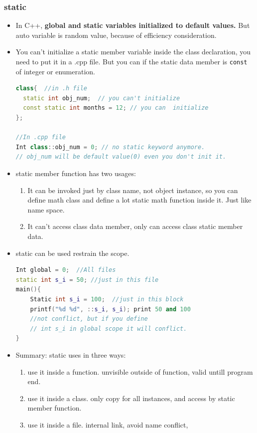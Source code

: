 \documentclass[a4paper,12pt,twoside]{book}
\begin{document}
\subsubsection{static}
\begin{itemize}

\item In C++, \textbf{global and static variables initialized to default values.}  But auto variable is random value, because of efficiency consideration.

\item You can't initialize a static member variable inside the class declaration, you need to put it in a .cpp file.   But you can if the static data member is \texttt{const} of integer or enumeration.
\begin{lstlisting}[frame=single, language=c++]
class{  //in .h file
  static int obj_num;  // you can't initialize
  const static int months = 12; // you can  initialize
};

//In .cpp file
Int class::obj_num = 0; // no static keyword anymore.
// obj_num will be default value(0) even you don't init it.
\end{lstlisting}

\item static member function has two usages:
\begin{enumerate}
\item It can be invoked just by class name, not object instance, so you can define math class and define a lot static math function inside it.  Just like name space.
\item It can't access class data member, only can access class static member data.
\end{enumerate}

\item static can be used restrain the scope.
\begin{lstlisting}[frame=single, language=c++]
Int global = 0;  //All files
static int s_i = 50; //just in this file
main(){
    Static int s_i = 100;  //just in this block
    printf("%d %d", ::s_i, s_i); print 50 and 100
    //not conflict, but if you define 
    // int s_i in global scope it will conflict. 
}
\end{lstlisting}

\item Summary: static uses in three ways:
\begin{enumerate}
\item use it inside a function. unvisible outside of function, valid untill program end.
\item use it inside a class. only copy for all instances, and access by static member function.
\item use it inside a file. internal link, avoid name conflict, 
\end{enumerate}

\end{itemize}
\end{document}
